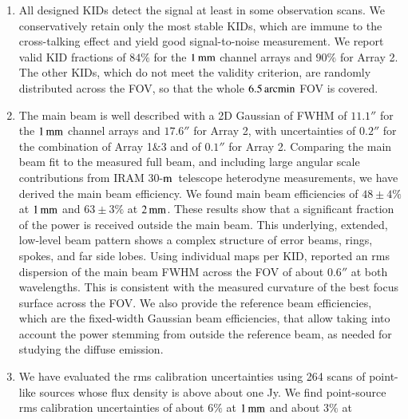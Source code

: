 \documentclass[traditionalabstract]{aa}
\newcommand{\trentemetre}{30-$\rm{m}$}
\newcommand{\lp}[1]{#1}
\newcommand{\rev}[1]{#1}
\begin{document}
\begin{enumerate}
\item %
  All designed KIDs detect the
  signal at least in some observation
  scans. We conservatively retain only the most stable KIDs, which are
  immune to the cross-talking effect and yield good signal-to-noise
  measurement. 
  We report valid KID fractions of $84\%$
  for the $1\,\rm{mm}$ channel arrays and $90\%$ for Array 2. The other
  KIDs, which do not meet the validity criterion, are randomly
  distributed across the FOV, so that the whole $6.5\,\rm{arcmin}$ FOV is
  covered.
  \vspace{1mm}
\item %
  The main beam is well described with a 2D
  Gaussian of FWHM of $11.1''$ for the $1\,\rm{mm}$ channel arrays
  and $17.6''$ for Array 2, with uncertainties of $0.2''$ for the
  combination of Array 1$\&$3 and of $0.1''$ for Array 2.
  {\rev Comparing the main beam fit to the measured full beam, and 
    including large angular scale contributions from IRAM
    \trentemetre\ telescope heterodyne measurements, we have derived the
  main beam efficiency.}
  We found main beam
  efficiencies of {\rev $48 \pm 4 \%$} at $1\,\rm{mm}$ and {\rev $63 \pm 3 \%$} at
  $2\,\rm{mm}$.
  {\lp These results show that a significant fraction of the power is received
    outside the main beam. This underlying,
    extended, low-level beam pattern shows a complex structure of error 
    beams, rings, spokes, {\rev and far side lobes}.}
  Using individual maps per KID, \citet{Adam2018} reported an rms
  dispersion of the main beam FWHM across the FOV of about $0.6''$ at
  both wavelengths. This is consistent with the measured curvature of
  the best focus surface across the FOV. 
  {\lp We also provide the reference beam efficiencies, which are the
    fixed-width Gaussian beam efficiencies, that allow taking into
    account the power stemming from outside the reference beam, {\rev
      as needed for studying the diffuse emission.}} 
  \vspace{1mm}
\item %
  We have evaluated the rms calibration uncertainties using 264 
  scans of {\rev point-like} sources whose flux density is above about
  one Jy. We find {\rev point-source} rms calibration
  uncertainties of about $6\%$ at $1\,\rm{mm}$ and about $3\%$ at

\end{enumerate}
\end{document}
